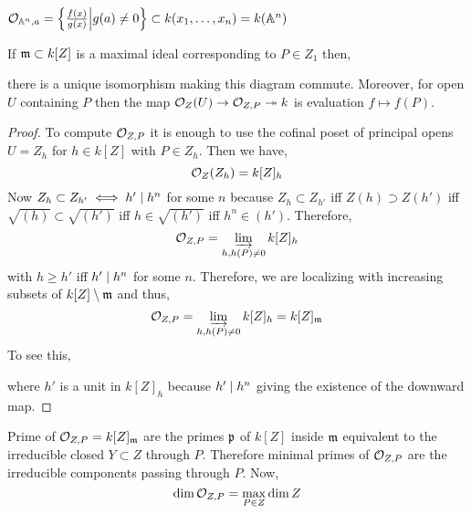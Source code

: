 \documentclass[12pt]{article}
\begin{document}
\begin{example}
$\mathcal{O}_{\mathbb{A}^n, a} = \left\{ \frac{f(x)}{g(x)} \middle| g(a) \neq 0 \right\} \subset k(x_1, \dots, x_n) = k(\mathbb{A}^n)$
\end{example}

\begin{thm}
If $\mathfrak{m} \subset k[Z]$ is a maximal ideal corresponding to $P \in Z_1$ then,
\begin{center}
\end{center}
there is a unique isomorphism making this diagram commute. Moreover, for open $U$ containing $P$ then the map $\mathcal{O}_{Z}(U) \to \mathcal{O}_{Z, P} \twoheadrightarrow k$ is evaluation $f \mapsto f(P)$. 
\end{thm}

\begin{proof}
To compute $\mathcal{O}_{Z, P}$ it is enough to use the cofinal poset of principal opens $U = Z_h$ for $h \in k[Z]$ with $P \in Z_h$. Then we have,
\[ \mathcal{O}_{Z}(Z_h) = k[Z]_h \]
Now $Z_h \subset Z_{h'} \iff h' \mid h^n$ for some $n$ because $Z_h \subset Z_{h'}$ iff $Z(h) \supset Z(h')$ iff $\sqrt{(h)} \subset \sqrt{(h')}$ iff $h \in \sqrt{(h')}$ iff $h^n \in (h')$. Therefore, 
\[ \mathcal{O}_{Z, P} = \varinjlim_{h, h(P) \neq 0} k[Z]_h \]
with $h \ge h'$ iff $h' \mid h^n$ for some $n$. Therefore, we are localizing with increasing subsets of $k[Z] \setminus \mathfrak{m}$ and thus,
\[ \mathcal{O}_{Z, P} = \varinjlim_{h, h(P) \neq 0} k[Z]_h = k[Z]_{\mathfrak{m}} \]
To see this,
\begin{center}
\end{center}
where $h'$ is a unit in $k[Z]_h$ because $h' \mid h^n$ giving the existence of the downward map. 
\end{proof}

\begin{rmk}
Prime of $\mathcal{O}_{Z, P} = k[Z]_{\mathfrak{m}}$ are the primes $\mathfrak{p}$ of $k[Z]$ inside $\mathfrak{m}$ equivalent to the irreducible closed $Y \subset Z$ through $P$. Therefore minimal primes of $\mathcal{O}_{Z, P}$ are the irreducible components passing through $P$. Now,
\[ \dim{\mathcal{O}_{Z, P}} = \max_{P \in Z} \dim{Z} \]
\end{rmk}
\end{document}
